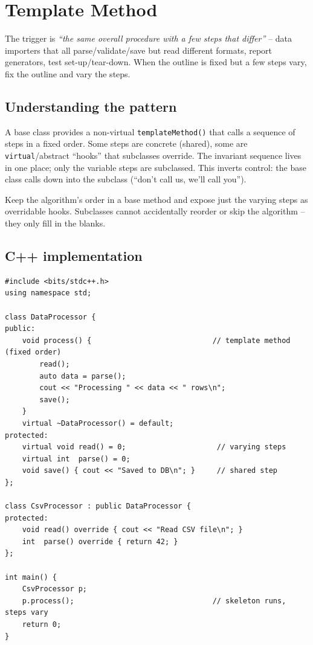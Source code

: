 \section{Template Method}
\label{sec:pat-template-method}


\begin{patternbox}
The trigger is \emph{``the same overall procedure with a few steps that
differ''} -- data importers that all parse/validate/save but read
different formats, report generators, test set-up/tear-down. When the
outline is fixed but a few steps vary, fix the outline and vary the steps.
\end{patternbox}

\subsection*{Understanding the pattern}

A base class provides a non-virtual \texttt{templateMethod()} that calls a
sequence of steps in a fixed order. Some steps are concrete (shared), some
are \texttt{virtual}/abstract ``hooks'' that subclasses override. The
invariant sequence lives in one place; only the variable steps are
subclassed. This inverts control: the base class calls down into the
subclass (``don't call us, we'll call you'').

\begin{ideabox}
Keep the algorithm's order in a base method and expose just the varying
steps as overridable hooks. Subclasses cannot accidentally reorder or skip
the algorithm -- they only fill in the blanks.
\end{ideabox}

\subsection*{C++ implementation}

\begin{lstlisting}
#include <bits/stdc++.h>
using namespace std;

class DataProcessor {
public:
    void process() {                            // template method (fixed order)
        read();
        auto data = parse();
        cout << "Processing " << data << " rows\n";
        save();
    }
    virtual ~DataProcessor() = default;
protected:
    virtual void read() = 0;                     // varying steps
    virtual int  parse() = 0;
    void save() { cout << "Saved to DB\n"; }     // shared step
};

class CsvProcessor : public DataProcessor {
protected:
    void read() override { cout << "Read CSV file\n"; }
    int  parse() override { return 42; }
};

int main() {
    CsvProcessor p;
    p.process();                                // skeleton runs, steps vary
    return 0;
}
\end{lstlisting}

